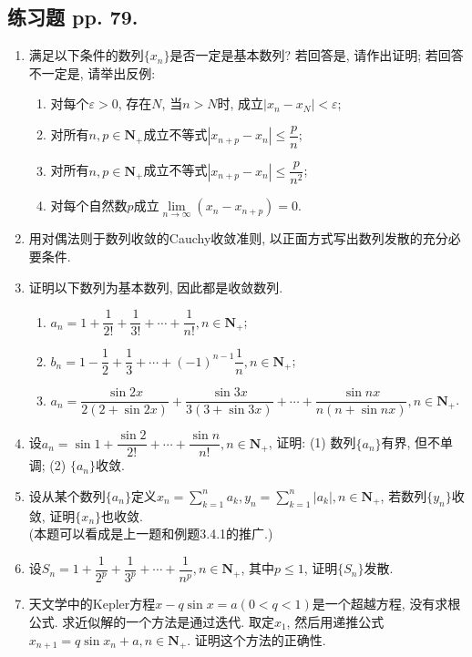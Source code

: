 \documentclass[a4paper,11pt,twoside]{ctexbook}
\begin{document}
\subsection{练习题 pp. 79.}
\begin{enumerate}
	\item 满足以下条件的数列$\{x_n\}$是否一定是基本数列? 若回答是, 请作出证明; 若回答不一定是, 请举出反例:
	      \begin{enumerate}[(1)]
		      \item 对每个$\varepsilon>0$, 存在$N$, 当$n>N$时, 成立$|x_n-x_N|<\varepsilon$;
		      \item 对所有$n,p\in\mathbf{N}_{+}$成立不等式$|x_{n+p}-x_n|\leqslant\dfrac{p}{n}$;
		      \item 对所有$n,p\in\mathbf{N}_{+}$成立不等式$|x_{n+p}-x_n|\leqslant\dfrac{p}{n^2}$;
		      \item 对每个自然数$p$成立$\lim\limits_{n\to\infty} (x_n-x_{n+p})=0$.
	      \end{enumerate}

	\item 用对偶法则于数列收敛的Cauchy收敛准则, 以正面方式写出数列发散的充分必要条件.

	\item 证明以下数列为基本数列, 因此都是收敛数列.
	      \begin{enumerate}[(1)]
		      \item $a_n=1+\dfrac{1}{2!}+\dfrac{1}{3!}+\cdots+\dfrac{1}{n!}, n\in\mathbf{N}_{+}$;
		      \item $b_n=1-\dfrac{1}{2}+\dfrac{1}{3}+\cdots+(-1)^{n-1}\dfrac{1}{n}, n\in\mathbf{N}_{+}$;
		      \item $a_n=\dfrac{\sin{2x}}{2(2+\sin{2x})}+\dfrac{\sin{3x}}{3(3+\sin{3x})}+\cdots+\dfrac{\sin{nx}}{n(n+\sin{nx})}, n\in\mathbf{N}_{+}$.
	      \end{enumerate}

	\item 设$a_n=\sin{1}+\dfrac{\sin{2}}{2!}+\cdots+\dfrac{\sin{n}}{n!}, n\in\mathbf{N}_{+}$, 证明: (1) 数列$\{a_n\}$有界, 但不单调; (2) $\{a_n\}$收敛.

	\item 设从某个数列$\{a_n\}$定义$x_n=\sum\limits_{k=1}^n a_k, y_n=\sum\limits_{k=1}^n |a_k|, n\in\mathbf{N}_{+}$, 若数列$\{y_n\}$收敛, 证明$\{x_n\}$也收敛.\\
	      (本题可以看成是上一题和例题3.4.1的推广.)

	\item 设$S_n=1+\dfrac{1}{2^p}+\dfrac{1}{3^p}+\cdots+\dfrac{1}{n^p}, n\in\mathbf{N}_{+}$, 其中$p\leqslant 1$, 证明$\{S_n\}$发散.

	\item 天文学中的Kepler方程$x-q\sin{x}=a (0<q<1)$是一个超越方程, 没有求根公式. 求近似解的一个方法是通过迭代. 取定$x_1$, 然后用递推公式$x_{n+1}=q\sin{x_n}+a, n\in\mathbf{N}_{+}$. 证明这个方法的正确性.
\end{enumerate}
\end{document}
